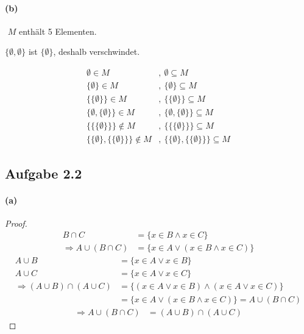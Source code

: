 \paragraph{(b)}
$ $\newline
$M$ enthält 5 Elementen.
\begin{remark}
$\{\emptyset,\emptyset\}$ ist $\{\emptyset\}$, deshalb verschwindet.
\end{remark}
\begin{align*}
\emptyset\in M&,\ \emptyset\subseteq M\\
\{\emptyset\}\in M&,\ \{\emptyset\}\subseteq M\\
\{\{\emptyset\}\}\in M&,\ \{\{\emptyset\}\}\subseteq M\\
\{\emptyset,\{\emptyset\}\}\in M&,\ \{\emptyset,\{\emptyset\}\}\subseteq M\\
\{\{\{\emptyset\}\}\}\notin M&,\ \{\{\{\emptyset\}\}\}\subseteq M\\
\{\{\emptyset\},\{\{\emptyset\}\}\}\notin M&,\ \{\{\emptyset\},\{\{\emptyset\}\}\}\subseteq M
\end{align*}

\newpage

\subsection{Aufgabe 2.2}

\paragraph{(a)}
\begin{proof}
$ $\newline
\begin{align}
B\cap C&=\{x\in B\wedge x\in C\}\\
\Rightarrow A\cup(B\cap C)&=\{x\in A\vee(x\in B\wedge x\in C)\}
\end{align}
\begin{align}
A\cup B&=\{x\in A\vee x\in B\}\\
A\cup C&=\{x\in A\vee x\in C\}\\
\Rightarrow (A\cup B)\cap(A\cup C)&=\{(x\in A\vee x\in B)\wedge(x\in A\vee x\in C)\}\\
&=\{x\in A\vee(x\in B\wedge x\in C)\}=A\cup(B\cap C)
\end{align}
\begin{align}
\Rightarrow A\cup(B\cap C)&=(A\cup B)\cap(A\cup C)
\end{align}
\end{proof}

